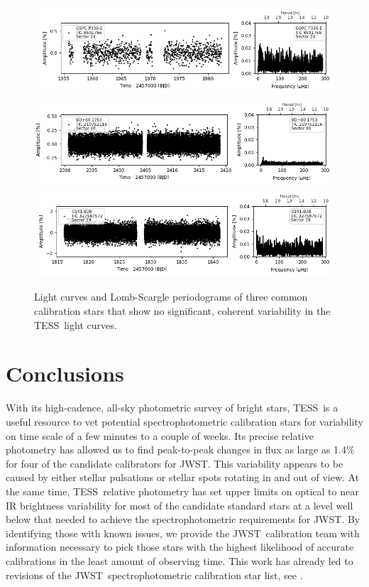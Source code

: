 \documentclass[twocolumn]{aastex631}
\newcommand{\webb}{JWST}
\newcommand{\jwst}{JWST}
\newcommand{\tess}{TESS}
\begin{document}
\begin{figure}
    \centering
    \includegraphics[width=0.8\linewidth]{figures/tic00000008591766_s024_flat2.fits.png}
    \includegraphics[width=0.8\linewidth]{tic00000219752116_s040_flat1.fits.png}
    \includegraphics[width=0.8\linewidth]{figures/tic00000327587572_s019_norm1.fits.png}
    \caption{Light curves and Lomb-Scargle periodograms of three common calibration stars that show no significant, coherent variability in the \tess\ light curves.}
    \label{fig:novar}
\end{figure}




\section{Conclusions}
\label{sec:conclusion}

With its high-cadence, all-sky photometric survey of bright stars, \tess\ is a useful resource to vet potential spectrophotometric calibration stars for variability on time scale of a few minutes to a couple of weeks. Its precise relative photometry has allowed us to find peak-to-peak changes in flux as large as 1.4\% for four of the candidate calibrators for \webb. This variability appears to be caused by either stellar pulsations or stellar spots rotating in and out of view. At the same time, \tess\ relative photometry has set upper limits on optical to near IR brightness variability for most of the candidate standard stars at a level well below that needed to achieve the spectrophotometric requirements for \jwst. By identifying those with known issues, we provide the \webb\ calibration team with information necessary to pick those stars with the highest likelihood of accurate calibrations in the least amount of observing time. This work has already led to revisions of the \webb\ spectrophotometric calibration star list, see \citet{Gordon2022inprep}.
\end{document}
